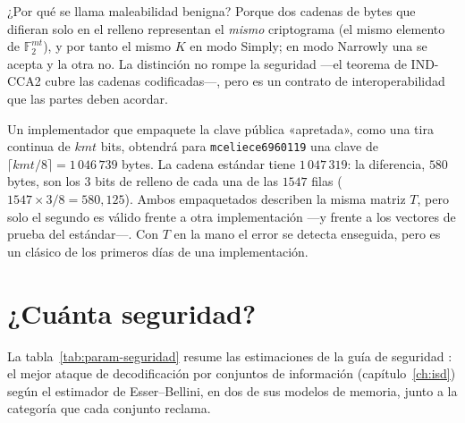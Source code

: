 \documentclass[11pt,a4paper,oneside]{report}
\newcommand{\F}{\mathbb{F}}
\newcommand{\Ftwo}{\F_2}
\begin{document}
¿Por qué se llama maleabilidad benigna? Porque dos cadenas de bytes
que difieran solo en el relleno representan el \emph{mismo}
criptograma (el mismo elemento de $\Ftwo^{mt}$), y por tanto el mismo
$K$ en modo Simply; en modo Narrowly una se acepta y la otra no. La
distinción no rompe la seguridad ---el teorema de IND-CCA2 cubre las
cadenas codificadas---, pero es un contrato de interoperabilidad que
las partes deben acordar.

\begin{trampa}
Un implementador que empaquete la clave pública «apretada», como una
tira continua de $kmt$ bits, obtendrá para \texttt{mceliece6960119}
una clave de $\lceil kmt/8\rceil=1\,046\,739$ bytes. La cadena
estándar tiene $1\,047\,319$: la diferencia, $580$ bytes, son los
$3$ bits de relleno de cada una de las $1547$ filas
($1547\times3/8=580{,}125$). Ambos empaquetados describen la misma
matriz $T$, pero solo el segundo es válido frente a otra
implementación ---y frente a los vectores de prueba del
estándar---. Con $T$ en la mano el error se detecta enseguida, pero es
un clásico de los primeros días de una implementación.
\end{trampa}

\section{¿Cuánta seguridad?}\label{sec:param-seguridad}

La tabla~\ref{tab:param-seguridad} resume las estimaciones de la guía
de seguridad \cite{cmsecurity}: el mejor ataque de decodificación por
conjuntos de información (capítulo~\ref{ch:isd}) según el estimador de
Esser--Bellini, en dos de sus modelos de memoria, junto a la categoría
que cada conjunto reclama.
\end{document}
